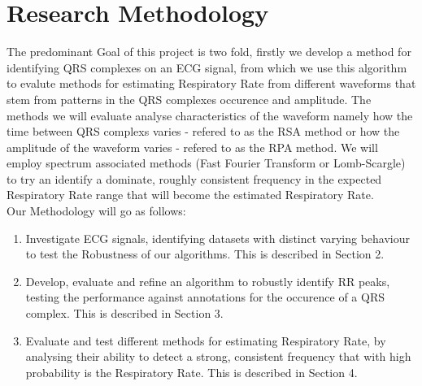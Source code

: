 \section{Research Methodology}
The predominant Goal of this project is two fold, firstly we develop a method for identifying 
QRS complexes on an ECG signal, from which we use this algorithm to evalute methods for estimating Respiratory Rate from 
different waveforms that stem from patterns in the QRS complexes occurence and amplitude.
The methods we will evaluate analyse characteristics of the waveform namely how the 
time between QRS complexs varies - refered to as the RSA method or how the amplitude 
of the waveform varies - refered to as the RPA method. We will employ spectrum associated methods (Fast Fourier Transform or Lomb-Scargle) 
to try an identify a dominate, roughly consistent frequency in the expected Respiratory Rate range that 
will become the estimated Respiratory Rate. \\
Our Methodology will go as follows:
\begin{enumerate}
        \item Investigate ECG signals, identifying datasets with distinct varying behaviour to test the Robustness of our algorithms.
        This is described in Section 2.
        \item Develop, evaluate and refine an algorithm to robustly identify RR peaks, testing the performance 
        against annotations for the occurence of a QRS complex. This is described in Section 3.
        \item Evaluate and test different methods for estimating Respiratory Rate, by analysing their ability 
        to detect a strong, consistent frequency that with high probability is the Respiratory Rate. This is described in Section 4.
\end{enumerate}